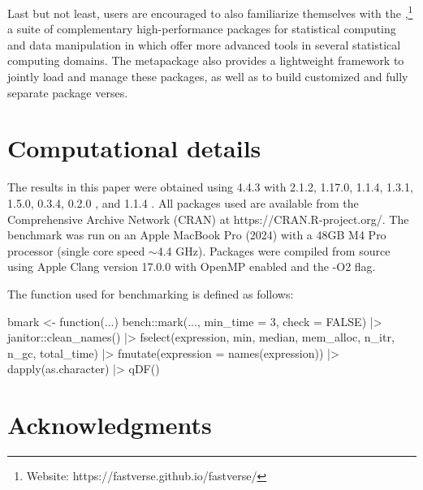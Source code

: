 \documentclass[nojss]{jss} %
\newcommand{\fct}[1]{\code{#1()}}
\begin{document}
Last but not least,  users are encouraged to also familiarize themselves with the \href{https://fastverse.github.io/fastverse/}{},\footnote{Website: https://fastverse.github.io/fastverse/} a suite of complementary high-performance packages for statistical computing and data manipulation in  which offer more advanced tools in several statistical computing domains. The  metapackage also provides a lightweight framework to jointly load and manage these packages, as well as to build customized and fully separate package verses.

\newpage

\section*{Computational details}
The results in this paper were obtained using  \citep{R} 4.4.3 with  2.1.2,  1.17.0,  1.1.4,  1.3.1,  1.5.0,  0.3.4,  0.2.0 \citep{rnycflights23}, and  1.1.4 \citep{rbench}. All packages used are available from the Comprehensive  Archive Network (CRAN) at https://CRAN.R-project.org/. The benchmark was run on an Apple MacBook Pro (2024) with a 48GB M4 Pro processor (single core speed $\sim$4.4 GHz). Packages were compiled from source using Apple Clang version 17.0.0 with OpenMP enabled and the -O2 flag. \newline

The \fct{bmark} function used for benchmarking is defined as follows:
\begin{Code}
bmark <- function(...) {
  bench::mark(..., min_time = 3, check = FALSE) |>
    janitor::clean_names() |>
    fselect(expression, min, median, mem_alloc, n_itr, n_gc, total_time) |>
    fmutate(expression = names(expression)) |>
    dapply(as.character) |> qDF()
}
\end{Code}



\section*{Acknowledgments}
\end{document}
